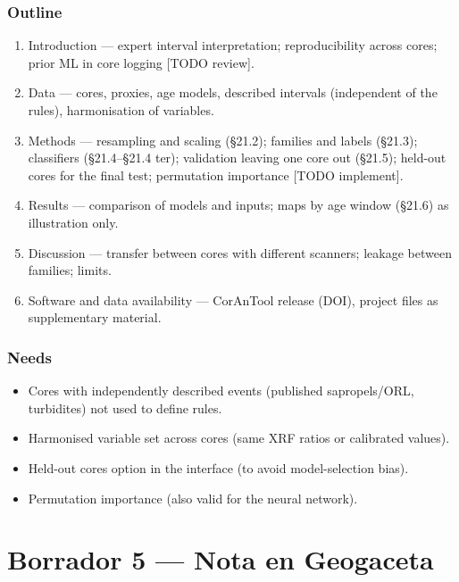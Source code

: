 \documentclass[
  10pt,
]{article}
\providecommand{\tightlist}{%
  \setlength{\itemsep}{0pt}\setlength{\parskip}{0pt}}
\begin{document}
\hypertarget{outline-2}{%
\subsubsection{Outline}\label{outline-2}}

\begin{enumerate}
\def\labelenumi{\arabic{enumi}.}
\tightlist
\item
  Introduction --- expert interval interpretation; reproducibility
  across cores; prior ML in core logging {[}TODO review{]}.
\item
  Data --- cores, proxies, age models, described intervals (independent
  of the rules), harmonisation of variables.
\item
  Methods --- resampling and scaling (§21.2); families and labels
  (§21.3); classifiers (§21.4--§21.4 ter); validation leaving one core
  out (§21.5); held-out cores for the final test; permutation importance
  {[}TODO implement{]}.
\item
  Results --- comparison of models and inputs; maps by age window
  (§21.6) as illustration only.
\item
  Discussion --- transfer between cores with different scanners; leakage
  between families; limits.
\item
  Software and data availability --- CorAnTool release (DOI), project
  files as supplementary material.
\end{enumerate}

\hypertarget{needs-2}{%
\subsubsection{Needs}\label{needs-2}}

\begin{itemize}
\tightlist
\item[$\square$]
  Cores with independently described events (published sapropels/ORL,
  turbidites) not used to define rules.
\item[$\square$]
  Harmonised variable set across cores (same XRF ratios or calibrated
  values).
\item[$\square$]
  Held-out cores option in the interface (to avoid model-selection
  bias).
\item[$\square$]
  Permutation importance (also valid for the neural network).
\end{itemize}

\newpage

\hypertarget{borrador-5-nota-en-geogaceta}{%
\section{Borrador 5 --- Nota en
Geogaceta}\label{borrador-5-nota-en-geogaceta}}
\end{document}
